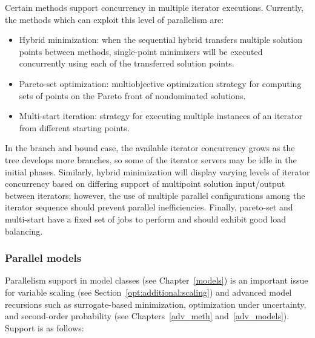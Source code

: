 Certain methods support concurrency in multiple iterator
executions. Currently, the methods which can exploit this level of
parallelism are:

\begin{itemize}
\item Hybrid minimization: when the sequential hybrid transfers multiple
solution points between methods, single-point minimizers will be executed
concurrently using each of the transferred solution points.


\item Pareto-set optimization: multiobjective optimization strategy for
computing sets of points on the Pareto front of nondominated solutions.

\item Multi-start iteration: strategy for executing multiple instances
of an iterator from different starting points.
\end{itemize}

In the branch and bound case, the available iterator concurrency grows
as the tree develops more branches, so some of the iterator servers
may be idle in the initial phases. Similarly, hybrid minimization will
display varying levels of iterator concurrency based on differing
support of multipoint solution input/output between iterators;
however, the use of multiple parallel configurations among the iterator
sequence should prevent parallel inefficiencies.  Finally, pareto-set
and multi-start have a fixed set of jobs to perform and should exhibit
good load balancing.

\subsubsection{Parallel models}\label{parallel:algorithms:models}

Parallelism support in model classes (see Chapter~\ref{models}) is an
important issue for variable scaling (see
Section~\ref{opt:additional:scaling}) and advanced model recursions
such as surrogate-based minimization, optimization under uncertainty,
and second-order probability (see Chapters~\ref{adv_meth}
and~\ref{adv_models}).  Support is as follows:

